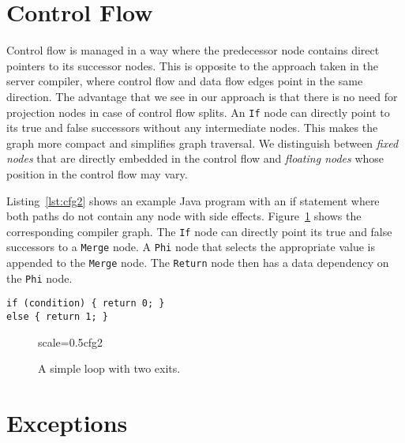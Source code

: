 \documentclass[twocolumn]{svjour3}
\begin{document}
\section{Control Flow}

Control flow is managed in a way where the predecessor node contains direct pointers to its successor nodes.
This is opposite to the approach taken in the server compiler, where control flow and data flow edges point in the same direction.
The advantage that we see in our approach is that there is no need for projection nodes in case of control flow splits.
An \texttt{If} node can directly point to its true and false successors without any intermediate nodes.
This makes the graph more compact and simplifies graph traversal.
We distinguish between \textit{fixed nodes} that are directly embedded in the control flow and \textit{floating nodes} whose position in the control flow may vary.

Listing~\ref{lst:cfg2} shows an example Java program with an if statement where both paths do not contain any node with side effects.
Figure~\ref{fig:loopexits} shows the corresponding compiler graph.
The \texttt{If} node can directly point its true and false successors to a \texttt{Merge} node.
A \texttt{Phi} node that selects the appropriate value is appended to the \texttt{Merge} node.
The \texttt{Return} node then has a data dependency on the \texttt{Phi} node.

\begin{lstlisting}[label=lst:cfg2, caption=Control flow in the graph., captionpos=b]
if (condition) { return 0; }
else { return 1; }
\end{lstlisting}

\begin{figure}[ht]
  \centering
\begin{digraphenv}{scale=0.5}{cfg2}
\end{digraphenv}
  \caption{A simple loop with two exits.}
  \label{fig:loopexits}
\end{figure}

\section{Exceptions}
\label{sec:Exceptions}
\end{document}

